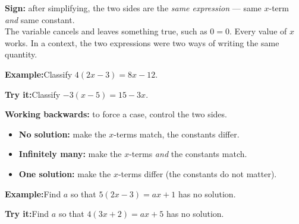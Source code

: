 \documentclass[12pt]{article}
\begin{document}
\begin{formulabox}\textbf{Sign:} after simplifying, the two sides are the \emph{same
expression} --- same $x$-term \emph{and} same constant.\\[3pt]
The variable cancels and leaves something true, such as $0 = 0$. Every value of $x$ works.
In a context, the two expressions were two ways of writing the same quantity.
\end{formulabox}
\begin{examplebox}\textbf{Example:}\quad Classify $4(2x - 3) = 8x - 12$.
\end{examplebox}
\begin{tryitbox}\textbf{Try it:}\quad Classify $-3(x - 5) = 15 - 3x$.\\[2pt]
\end{tryitbox}

\begin{formulabox}\textbf{Working backwards:} to force a case, control the two sides.
\begin{itemize}[itemsep=1pt, topsep=2pt]
  \item \textbf{No solution:} make the $x$-terms match, the constants differ.
  \item \textbf{Infinitely many:} make the $x$-terms \emph{and} the constants match.
  \item \textbf{One solution:} make the $x$-terms differ (the constants do not matter).
\end{itemize}
\end{formulabox}
\begin{examplebox}\textbf{Example:}\quad Find $a$ so that $5(2x - 3) = ax + 1$ has no solution.
\end{examplebox}
\begin{tryitbox}\textbf{Try it:}\quad Find $a$ so that $4(3x + 2) = ax + 5$ has no solution.\\[2pt]
\end{tryitbox}
\end{document}
